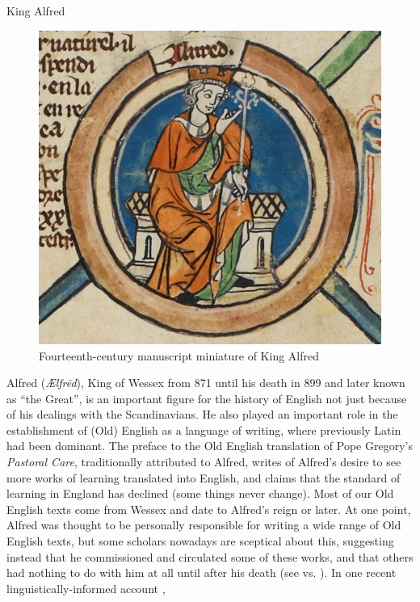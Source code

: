 \begin{peoplebox}{King Alfred}
\begin{figure}
    \centering
    \includegraphics[scale=0.23]{chapters/img/Alfred.jpg}
    \caption{Fourteenth-century manuscript miniature of King Alfred}
    \label{fig:OE_Alfred}
\end{figure}

Alfred (\emph{Ælfrēd}), King of Wessex from 871 until his death in 899 and later known as ``the Great'', is an important figure for the history of English not just because of his dealings with the Scandinavians. He also played an important role in the establishment of (Old) English as a language of writing, where previously Latin had been dominant. The preface to the Old English translation of Pope Gregory's \emph{Pastoral Care}, traditionally attributed to Alfred, writes of Alfred's desire to see more works of learning translated into English, and claims that the standard of learning in England has declined (some things never change). Most of our Old English texts come from Wessex and date to Alfred's reign or later. At one point, Alfred was thought to be personally responsible for writing a wide range of Old English texts, but some scholars nowadays are sceptical about this, suggesting instead that he commissioned and circulated some of these works, and that others had nothing to do with him at all until after his death (see \citealp{Godden2007} vs. \citealp{Bately2009}). In one recent linguistically-informed account \citep[143]{Timofeeva2018},


\end{peoplebox}
